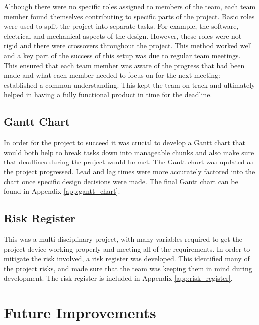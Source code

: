 \documentclass[a4paper,12pt]{article}
\begin{document}
Although there were no specific roles assigned to members of the team, each team member found themselves contributing to specific parts of the project. Basic roles were used to split the project into separate tasks. For example, the software, electrical and mechanical aspects of the design. However, these roles were not rigid and there were crossovers throughout the project. This method worked well and a key part of the success of this setup was due to regular team meetings. This ensured that each team member was aware of the progress that had been made and what each member needed to focus on for the next meeting: established a common understanding. This kept the team on track and ultimately helped in having a fully functional product in time for the deadline.

\subsection{Gantt Chart}
\label{sec:gantt_chart}

In order for the project to succeed it was crucial to develop a Gantt chart that would both help to break tasks down into manageable chunks and also make sure that deadlines during the project would be met. The Gantt chart was updated as the project progressed. Lead and lag times were more accurately factored into the chart once specific design decisions were made. The final Gantt chart can be found in Appendix \ref{app:gantt_chart}.

\subsection{Risk Register}
\label{sec:risk_register}

This was a multi-disciplinary project, with many variables required to get the project device working properly and meeting all of the requirements. In order to mitigate the risk involved, a risk register was developed. This identified many of the project risks, and made sure that the team was keeping them in mind during development. The risk register is included in Appendix \ref{app:risk_register}.


\newpage
\section{Future Improvements}
\label{sec:future_improvements}
\end{document}
